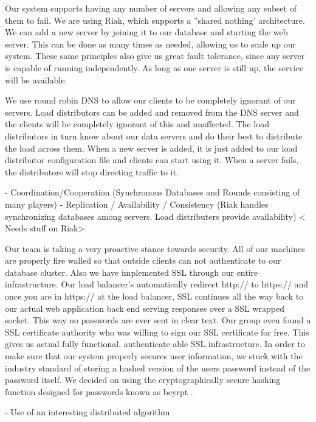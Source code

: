 \documentclass{dependencies/acm_proc_article-sp}
\begin{document}
Our system supports having any number of servers and allowing any subset of them to fail.  We are using Riak, which supports a ''shared nothing' architecture.  We can add a new server by joining it to our database and starting the web server.  This can be done as many times as needed, allowing us to scale up our system.  These same principles also give us great fault tolerance, since any server is capable of running independently.  As long as one server is still up, the service will be available.

We use round robin DNS to allow our clients to be completely ignorant of our servers.  Load distributors can be added and removed from the DNS server and the clients will be completely ignorant of this and unaffected.  The load distributors in turn know about our data servers and do their best to distribute the load across them.  When a new server is added, it is just added to our load distributor configuration file and clients can start using it.  When a server fails, the distributors will stop directing traffic to it.


- Coordination/Cooperation (Synchronous Databases and Rounds consisting of many players)
- Replication / Availability / Consistency (Riak handles synchronizing databases among servers. Load distributers provide availability)
  < Needs stuff on Riak>

 Our team is taking a very proactive stance towards security. All of our machines are properly fire walled so that
 outside clients can not authenticate to our database cluster. Also we have implemented SSL through our entire infrastructure.
 Our load balancer's automatically redirect http:// to https:// and once you are in https:// at the load balancer, SSL continues all the
 way back to our actual web application back end serving responses over a SSL wrapped socket. This way no passwords are ever
 sent in clear text. Our group even found a SSL certificate authority who was willing to sign our SSL certificate for free. This gives
 us actual fully functional, authenticate able SSL infrastructure. In order to make sure that our system properly secures user information,
 we stuck with the industry standard of storing a hashed version of the users password instead of the password itself. We decided on using
 the cryptographically secure hashing function designed for passwords known as bcyrpt \cite{bcrypt}.

- Use of an interesting distributed algorithm



\newpage
%

%
%
\balancecolumns
\end{document}
